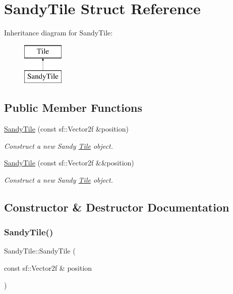 \hypertarget{structSandyTile}{}\section{Sandy\+Tile Struct Reference}
\label{structSandyTile}
Inheritance diagram for Sandy\+Tile\+:\begin{figure}[H]
\begin{center}
\leavevmode
\includegraphics[height=2.000000cm]{structSandyTile}
\end{center}
\end{figure}
\subsection*{Public Member Functions}
\begin{DoxyCompactItemize}
\item 
\mbox{\hyperlink{structSandyTile_abe47dff8443bf253df6c723894ea17ca}{Sandy\+Tile}} (const sf\+::\+Vector2f \&position)
\begin{DoxyCompactList}\small\item\em Construct a new Sandy \mbox{\hyperlink{classTile}{Tile}} object. \end{DoxyCompactList}\item 
\mbox{\hyperlink{structSandyTile_abf3581d4b2dbb27675ed3f1eab38324d}{Sandy\+Tile}} (const sf\+::\+Vector2f \&\&position)
\begin{DoxyCompactList}\small\item\em Construct a new Sandy \mbox{\hyperlink{classTile}{Tile}} object. \end{DoxyCompactList}\end{DoxyCompactItemize}


\subsection{Constructor \& Destructor Documentation}
\mbox{\label{structSandyTile_abe47dff8443bf253df6c723894ea17ca}} 
\subsubsection{\texorpdfstring{SandyTile()}{SandyTile()}\hspace{0.1cm}{\footnotesize\ttfamily [1/2]}}
{\footnotesize\ttfamily Sandy\+Tile\+::\+Sandy\+Tile (\begin{DoxyParamCaption}\item[{const sf\+::\+Vector2f \&}]{position }\end{DoxyParamCaption})\hspace{0.3cm}{\ttfamily [explicit]}}



